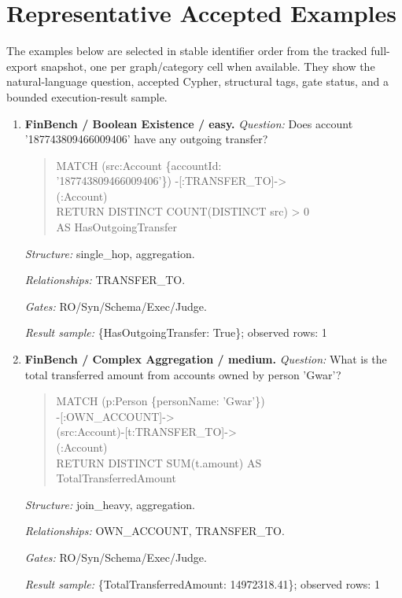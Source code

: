 \section{Representative Accepted Examples}
The examples below are selected in stable identifier order from the tracked full-export snapshot, one per graph/category cell when available. They show the natural-language question, accepted Cypher, structural tags, gate status, and a bounded execution-result sample.
\begin{enumerate}
\item \textbf{FinBench / Boolean Existence / easy.}
\textit{Question:} Does account '187743809466009406' have any outgoing transfer?
\begin{quote}\scriptsize\ttfamily\raggedright\sloppy
MATCH (src:Account \{accountId:\\
'187743809466009406'\}) -[:TRANSFER\_TO]-\textgreater{}\\
(:Account)\\
RETURN DISTINCT COUNT(DISTINCT src) \textgreater{} 0\\
AS HasOutgoingTransfer
\end{quote}
\textit{Structure:} single\_hop, aggregation.\par
\textit{Relationships:} TRANSFER\_TO.\par
\textit{Gates:} RO/Syn/Schema/Exec/Judge.\par
\textit{Result sample:} \{HasOutgoingTransfer: True\}; observed rows: 1
\item \textbf{FinBench / Complex Aggregation / medium.}
\textit{Question:} What is the total transferred amount from accounts owned by person 'Gwar'?
\begin{quote}\scriptsize\ttfamily\raggedright\sloppy
MATCH (p:Person \{personName: 'Gwar'\})\\
-[:OWN\_ACCOUNT]-\textgreater{}\\
(src:Account)-[t:TRANSFER\_TO]-\textgreater{}\\
(:Account)\\
RETURN DISTINCT SUM(t.amount) AS\\
TotalTransferredAmount
\end{quote}
\textit{Structure:} join\_heavy, aggregation.\par
\textit{Relationships:} OWN\_ACCOUNT, TRANSFER\_TO.\par
\textit{Gates:} RO/Syn/Schema/Exec/Judge.\par
\textit{Result sample:} \{TotalTransferredAmount: 14972318.41\}; observed rows: 1

\end{enumerate}

